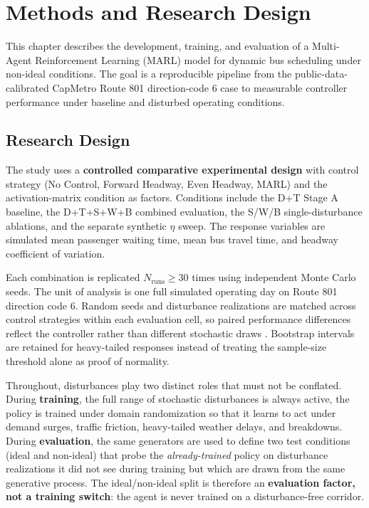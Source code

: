 \chapter{Methods and Research Design}

This chapter describes the development, training, and evaluation of a Multi-Agent Reinforcement Learning (MARL) model for dynamic bus scheduling under non-ideal conditions. The goal is a reproducible pipeline from the public-data-calibrated CapMetro Route 801 direction-code 6 case to measurable controller performance under baseline and disturbed operating conditions.


\section{Research Design}

The study uses a \textbf{controlled comparative experimental design} with control strategy (No Control, Forward Headway, Even Headway, MARL) and the activation-matrix condition as factors. Conditions include the D+T Stage A baseline, the D+T+S+W+B combined evaluation, the S/W/B single-disturbance ablations, and the separate synthetic $\eta$ sweep. The response variables are simulated mean passenger waiting time, mean bus travel time, and headway coefficient of variation.

Each combination is replicated $N_{\mathrm{runs}} \geq 30$ times using independent Monte Carlo seeds. The unit of analysis is one full simulated operating day on Route 801 direction code 6. Random seeds and disturbance realizations are matched across control strategies within each evaluation cell, so paired performance differences reflect the controller rather than different stochastic draws \cite{Henderson2018Matters,Agarwal2021Precipice}. Bootstrap intervals are retained for heavy-tailed responses instead of treating the sample-size threshold alone as proof of normality.

Throughout, disturbances play two distinct roles that must not be conflated. During \textbf{training}, the full range of stochastic disturbances is always active, the policy is trained under domain randomization \cite{Tang2024Curriculum} so that it learns to act under demand surges, traffic friction, heavy-tailed weather delays, and breakdowns. During \textbf{evaluation}, the same generators are used to define two test conditions (ideal and non-ideal) that probe the \textit{already-trained} policy on disturbance realizations it did not see during training but which are drawn from the same generative process. The ideal/non-ideal split is therefore an \textbf{evaluation factor, not a training switch}: the agent is never trained on a disturbance-free corridor. 
\pagebreak
